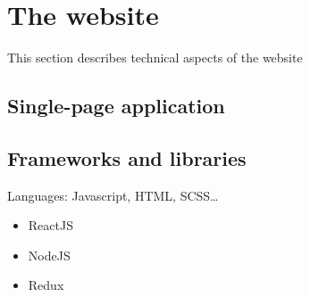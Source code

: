 \section{The website}
\label{sec:website}

This section describes technical aspects of the website

\subsection{Single-page application}
\label{ssec:spa}

\subsection{Frameworks and libraries}
\label{ssec:frameworks}

Languages: Javascript, HTML, SCSS\ldots

\begin{itemize}
    \item ReactJS
    \item NodeJS
    \item Redux
\end{itemize}
